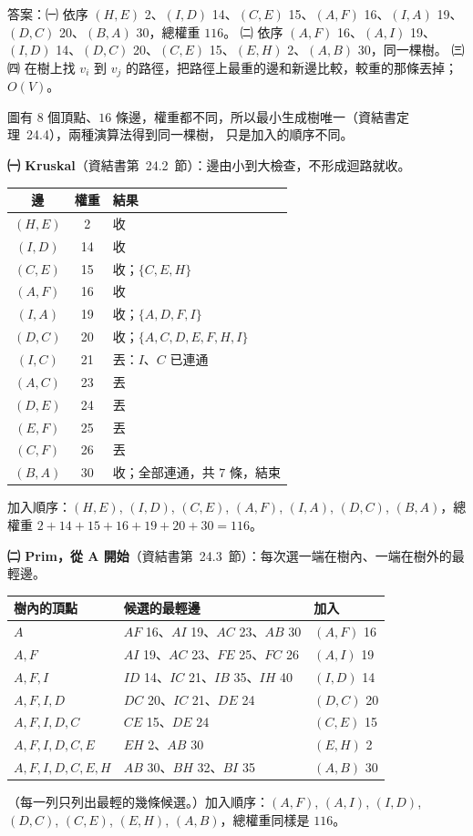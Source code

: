 \begin{pastsoln}
答案：㈠ 依序 $(H,E)$ 2、$(I,D)$ 14、$(C,E)$ 15、$(A,F)$ 16、$(I,A)$ 19、$(D,C)$ 20、$(B,A)$ 30，總權重 $116$。
㈡ 依序 $(A,F)$ 16、$(A,I)$ 19、$(I,D)$ 14、$(D,C)$ 20、$(C,E)$ 15、$(E,H)$ 2、$(A,B)$ 30，同一棵樹。
㈢㈣ 在樹上找 $v_i$ 到 $v_j$ 的路徑，把路徑上最重的邊和新邊比較，較重的那條丟掉；$O(V)$。

圖有 $8$ 個頂點、$16$ 條邊，權重都不同，所以最小生成樹唯一（資結書定理~24.4），兩種演算法得到同一棵樹，
只是加入的順序不同。

\textbf{㈠ Kruskal}（資結書第~24.2~節）：邊由小到大檢查，不形成迴路就收。
\begin{center}
\begin{tabular}{ccl}
\toprule
邊 & 權重 & 結果 \\
\midrule
$(H,E)$ & 2 & 收 \\
$(I,D)$ & 14 & 收 \\
$(C,E)$ & 15 & 收；$\{C,E,H\}$ \\
$(A,F)$ & 16 & 收 \\
$(I,A)$ & 19 & 收；$\{A,D,F,I\}$ \\
$(D,C)$ & 20 & 收；$\{A,C,D,E,F,H,I\}$ \\
$(I,C)$ & 21 & 丟：$I$、$C$ 已連通 \\
$(A,C)$ & 23 & 丟 \\
$(D,E)$ & 24 & 丟 \\
$(E,F)$ & 25 & 丟 \\
$(C,F)$ & 26 & 丟 \\
$(B,A)$ & 30 & 收；全部連通，共 $7$ 條，結束 \\
\bottomrule
\end{tabular}
\end{center}
加入順序：$(H,E)$, $(I,D)$, $(C,E)$, $(A,F)$, $(I,A)$, $(D,C)$, $(B,A)$，總權重 $2 + 14 + 15 + 16 + 19 + 20 + 30 = 116$。

\textbf{㈡ Prim，從 A 開始}（資結書第~24.3~節）：每次選一端在樹內、一端在樹外的最輕邊。
\begin{center}
\begin{tabular}{lll}
\toprule
樹內的頂點 & 候選的最輕邊 & 加入 \\
\midrule
$A$ & $AF$ 16、$AI$ 19、$AC$ 23、$AB$ 30 & $(A,F)$ 16 \\
$A, F$ & $AI$ 19、$AC$ 23、$FE$ 25、$FC$ 26 & $(A,I)$ 19 \\
$A, F, I$ & $ID$ 14、$IC$ 21、$IB$ 35、$IH$ 40 & $(I,D)$ 14 \\
$A, F, I, D$ & $DC$ 20、$IC$ 21、$DE$ 24 & $(D,C)$ 20 \\
$A, F, I, D, C$ & $CE$ 15、$DE$ 24 & $(C,E)$ 15 \\
$A, F, I, D, C, E$ & $EH$ 2、$AB$ 30 & $(E,H)$ 2 \\
$A, F, I, D, C, E, H$ & $AB$ 30、$BH$ 32、$BI$ 35 & $(A,B)$ 30 \\
\bottomrule
\end{tabular}
\end{center}
（每一列只列出最輕的幾條候選。）加入順序：$(A,F)$, $(A,I)$, $(I,D)$, $(D,C)$, $(C,E)$, $(E,H)$, $(A,B)$，總權重同樣是 $116$。


\end{pastsoln}
